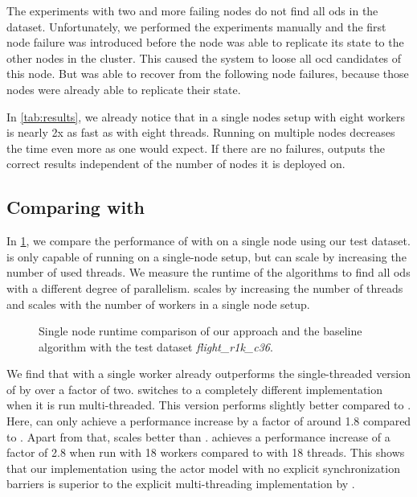   The experiments with two and more failing nodes do not find all \glspl{od} in the dataset.
  Unfortunately, we performed the experiments manually and the first node failure was introduced before the node was able to replicate its state to the other nodes in the cluster.
  This caused the system to loose all \gls{ocd} candidates of this node.
  But \dodo{} was able to recover from the following node failures, because those nodes were already able to replicate their state.

  In \cref{tab:results}, we already notice that \dodo{} in a single nodes setup with eight workers is nearly 2x as fast as \ocddiscover{} with eight threads.
  Running \dodo{} on multiple nodes decreases the time even more as one would expect.
  If there are no failures, \dodo{} outputs the correct results independent of the number of nodes it is deployed on.
  
\subsection{Comparing with \ocddiscover{}}\label{sec:evaluation:comparison}

  In \cref{fig:runtime-vs-ocddiscover}, we compare the performance of \dodo{} with \ocddiscover{} on a single node using our test dataset.
  \ocddiscover{} is only capable of running on a single-node setup, but can scale by increasing the number of used threads.
  We measure the runtime of the algorithms to find all \glspl{od} with a different degree of parallelism.
  \ocddiscover{} scales by increasing the number of threads and \dodo{} scales with the number of workers in a single node setup.

  \begin{figure}
    \centering
%    
    
    \caption{Single node runtime comparison of our approach and the baseline algorithm \ocddiscover{} with the test dataset \textit{flight\_r1k\_c36}.}
    \label{fig:runtime-vs-ocddiscover}
  \end{figure}

  We find that \dodo{} with a single worker already outperforms the single-threaded version of \ocddiscover{} by over a factor of two.
  \ocddiscover{} switches to a completely different implementation when it is run multi-threaded.
  This version performs slightly better compared to \dodo{}.
  Here, \dodo{} can only achieve a performance increase by a factor of around 1.8 compared to \ocddiscover{}.
  Apart from that, \dodo{} scales better than \ocddiscover{}.
  \dodo{} achieves a performance increase of a factor of 2.8 when run with 18 workers compared to \ocddiscover{} with 18 threads.
  This shows that our implementation using the actor model with no explicit synchronization barriers is superior to the explicit multi-threading implementation by \citeauthor{consonni}.

